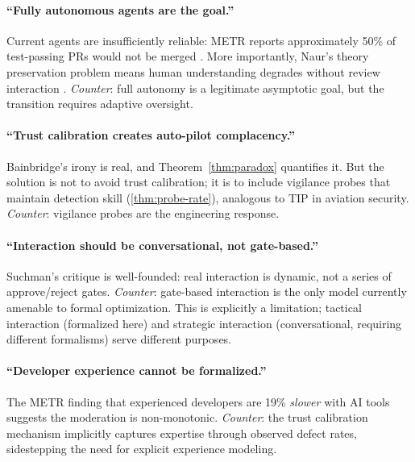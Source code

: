 \documentclass[11pt, a4paper]{googledeepmind}
\begin{document}
\paragraph{``Fully autonomous agents are the goal.''} Current agents are insufficiently reliable: METR reports approximately 50\% of test-passing PRs would not be merged \citep{metr2026}. More importantly, Naur's theory preservation problem means human understanding degrades without review interaction \citep{naur1985programming}. \emph{Counter}: full autonomy is a legitimate asymptotic goal, but the transition requires adaptive oversight.

\paragraph{``Trust calibration creates auto-pilot complacency.''} Bainbridge's irony is real, and Theorem~\ref{thm:paradox} quantifies it. But the solution is not to avoid trust calibration; it is to include vigilance probes that maintain detection skill (\ref{thm:probe-rate}), analogous to TIP in aviation security. \emph{Counter}: vigilance probes are the engineering response.

\paragraph{``Interaction should be conversational, not gate-based.''} Suchman's critique \citep{suchman1987plans} is well-founded: real interaction is dynamic, not a series of approve/reject gates. \emph{Counter}: gate-based interaction is the only model currently amenable to formal optimization. This is explicitly a limitation; tactical interaction (formalized here) and strategic interaction (conversational, requiring different formalisms) serve different purposes.

\paragraph{``Developer experience cannot be formalized.''} The METR finding that experienced developers are 19\% \emph{slower} with AI tools \citep{metr2026} suggests the moderation is non-monotonic. \emph{Counter}: the trust calibration mechanism implicitly captures expertise through observed defect rates, sidestepping the need for explicit experience modeling.
\end{document}
